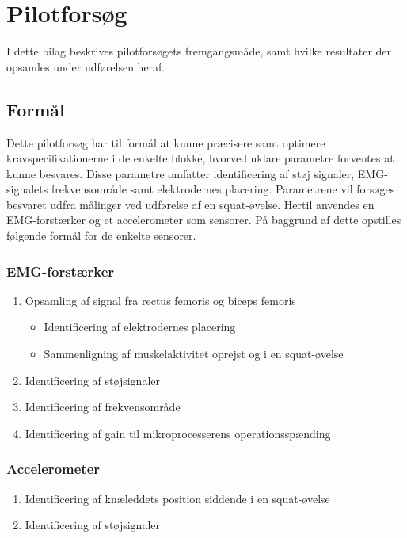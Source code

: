 \section{Pilotforsøg}
I dette bilag beskrives pilotforsøgets fremgangsmåde, samt hvilke resultater der opsamles under udførelsen heraf. 

\subsection{Formål}
Dette pilotforsøg har til formål at kunne præcisere samt optimere kravspecifikationerne i de enkelte blokke, hvorved uklare parametre forventes at kunne besvares. Disse parametre omfatter identificering af støj signaler, EMG-signalets frekvensområde samt elektrodernes placering. Parametrene vil forsøges besvaret udfra målinger ved udførelse af en squat-øvelse.
Hertil anvendes en EMG-forstærker og et accelerometer som sensorer. På baggrund af dette opstilles følgende formål for de enkelte sensorer.  

\subsubsection{EMG-forstærker}
\begin{enumerate}
\item Opsamling af signal fra rectus femoris og biceps femoris
\begin{itemize}
\item Identificering af elektrodernes placering
\item Sammenligning af muskelaktivitet oprejst og i en squat-øvelse 
\end{itemize}
\item Identificering af støjsignaler
\item Identificering af frekvensområde
\item Identificering af gain til mikroprocesserens operationsspænding
\end{enumerate}

\subsubsection{Accelerometer}
\begin{enumerate}
\item Identificering af knæleddets position siddende i en squat-øvelse
\item Identificering af støjsignaler
\end{enumerate}

